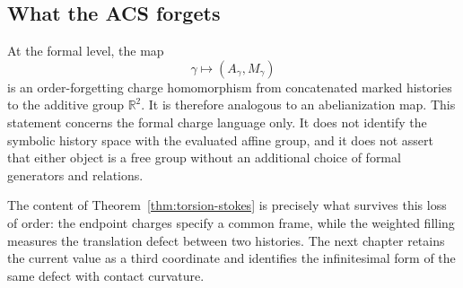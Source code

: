 \subsection{What the ACS forgets}

At the formal level, the map
\[
    \gamma\longmapsto(A_\gamma,M_\gamma)
\]
is an order-forgetting charge homomorphism from concatenated marked histories
to the additive group \(\mathbb R^2\).  It is therefore analogous to an
abelianization map.  This statement concerns the formal charge language only.
It does not identify the symbolic history space with the evaluated affine
group, and it does not assert that either object is a free group without an
additional choice of formal generators and relations.

The content of Theorem~\ref{thm:torsion-stokes} is precisely what survives this
loss of order: the endpoint charges specify a common frame, while the weighted
filling measures the translation defect between two histories.  The next
chapter retains the current value as a third coordinate and identifies the
infinitesimal form of the same defect with contact curvature.
